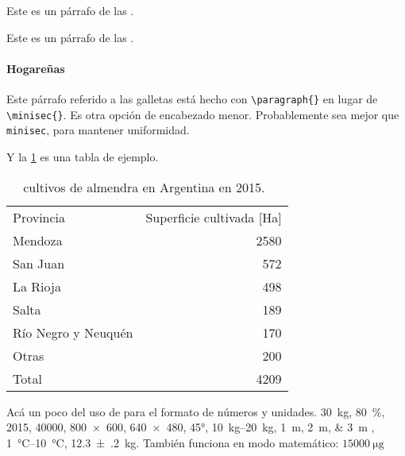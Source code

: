 
Este es un párrafo de las .



Este es un párrafo de las .


\paragraph{Hogareñas} Este párrafo referido a las galletas  está hecho con \texttt{\textbackslash paragraph\{\}} en lugar de \texttt{\textbackslash minisec\{\}}. Es otra opción de encabezado menor. Probablemente sea mejor que \texttt{minisec}, para mantener uniformidad.

Y la \cref{tabla:tabladeejemplo} es una tabla de ejemplo.

\begin{table}[hbt]
    \centering
    \caption[Cultivos de almendra en Argentina en 2015]{cultivos de almendra en Argentina en 2015.~\autocite{iannamico:cultivo}}
    \label{tabla:tabladeejemplo}
    \begin{tabular}{@{}lr@{}}
        \toprule
        Provincia           & Superficie cultivada {[}Ha{]} \\ \cmidrule{1-2} %
        Mendoza             & 2580                          \\
        San Juan            & 572                           \\
        La Rioja            & 498                           \\
        Salta               & 189                           \\
        Río Negro y Neuquén & 170                           \\
        Otras               & 200                           \\
        Total               & 4209                          \\ \bottomrule
    \end{tabular}
\end{table}


Acá un poco del uso de  para el formato de números y unidades. \SI{30}{\kg},  \SI{80}{\percent}, \num{2015}, \num{40000}, \SI{800x600}{\pixel}, \num{640x480}, \ang{45}, \SIrange{10}{20}{\kilogram}, \SIlist{1;2;3}{\metre} , \SIrange{1}{10}{\degreeCelsius}, \SI{12.3(2)}{\kilogram}. También funciona en modo matemático:
$ \SI{15000}{\micro\gram} $




